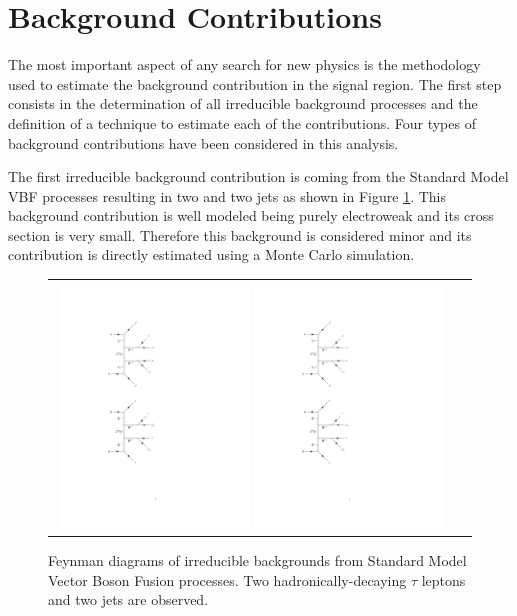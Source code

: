 \section{Background Contributions}
\label{sec::bg_contributions}

The most important aspect of any search for new physics is the methodology used to estimate the background contribution in the signal region. The first step consists in the determination of all irreducible background processes and the definition of a technique to estimate each of the contributions. Four types of background contributions have been considered in this analysis. 

The first irreducible background contribution is coming from the Standard Model VBF processes resulting in two \hadtau and two jets as shown in Figure \ref{fig:background_SMVBF}. This background contribution is well modeled being purely electroweak and its cross section is very small. Therefore this background is considered minor and its contribution is directly estimated using a Monte Carlo simulation.

\begin{figure}[tbh!]
	\centering
	\begin{tabular}{cc}
		\includegraphics[width=0.48\textwidth]{diagrams/pics/background_SMVBFminus.pdf}
		\includegraphics[width=0.48\textwidth]{diagrams/pics/background_SMVBFplus.pdf} 		
	\end{tabular}
	\caption{Feynman diagrams of irreducible backgrounds from Standard Model Vector Boson Fusion processes. Two hadronically-decaying $\tau$ leptons and two jets are observed. }
	\label{fig:background_SMVBF}
\end{figure}

